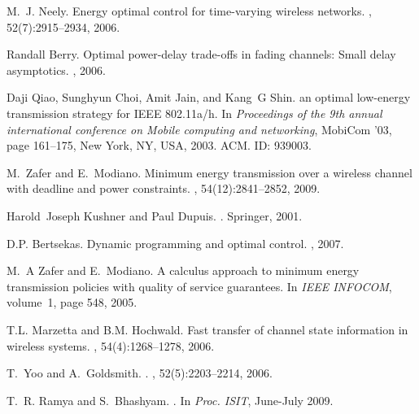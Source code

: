 \documentclass[11pt,journal, onecolumn]{./IEEEtran}
\begin{document}
\begin{thebibliography}{10}
M.~J. Neely.
\newblock Energy optimal control for time-varying wireless networks.
, 52(7):2915–2934,
  2006.

Randall Berry.
\newblock Optimal power-delay trade-offs in fading channels: Small delay
  asymptotics.
,
  2006.

Daji Qiao, Sunghyun Choi, Amit Jain, and Kang~G Shin.
 an optimal low-energy transmission strategy for {IEEE}
  802.11a/h.
\newblock In {\em Proceedings of the 9th annual international conference on
  Mobile computing and networking}, {MobiCom} '03, page 161–175, New York,
  {NY,} {USA}, 2003. {ACM}.
 {ID:} 939003.

M.~Zafer and E.~Modiano.
\newblock Minimum energy transmission over a wireless channel with deadline and
  power constraints.
, 54(12):2841--2852,
  2009.

Harold~Joseph Kushner and Paul Dupuis.
.
\newblock Springer, 2001.

{D.P.} Bertsekas.
\newblock Dynamic programming and optimal control.
, 2007.

M.~A Zafer and E.~Modiano.
\newblock A calculus approach to minimum energy transmission policies with
  quality of service guarantees.
\newblock In {\em {IEEE} {INFOCOM}}, volume~1, page 548, 2005.

{T.L.} Marzetta and {B.M.} Hochwald.
\newblock Fast transfer of channel state information in wireless systems.
, 54(4):1268--1278,
  2006.

T.~Yoo and A.~Goldsmith.
.
, 52(5):2203--2214,
  2006.

T.~{R. Ramya} and S.~Bhashyam.
.
\newblock In {\em Proc. ISIT}, June-July 2009.


\end{thebibliography}
\end{document}
